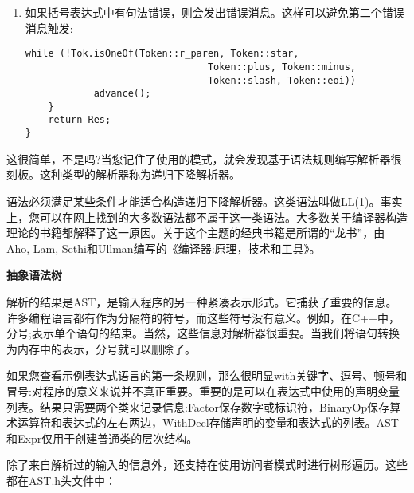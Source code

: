 \begin{enumerate}
\item 如果括号表达式中有句法错误，则会发出错误消息。这样可以避免第二个错误消息触发:
\begin{lstlisting}[caption={}]
			while (!Tok.isOneOf(Token::r_paren, Token::star,
								Token::plus, Token::minus,
								Token::slash, Token::eoi))
			advance();
	}
	return Res;
}
\end{lstlisting}

\end{enumerate}

这很简单，不是吗?当您记住了使用的模式，就会发现基于语法规则编写解析器很刻板。这种类型的解析器称为递归下降解析器。

\begin{tcolorbox}[colback=blue!5!white,colframe=blue!75!black, title=递归下降解析器不能适配所有语法]
语法必须满足某些条件才能适合构造递归下降解析器。这类语法叫做LL(1)。事实上，您可以在网上找到的大多数语法都不属于这一类语法。大多数关于编译器构造理论的书籍都解释了这一原因。关于这个主题的经典书籍是所谓的“龙书”，由Aho, Lam, Sethi和Ullman编写的《编译器:原理，技术和工具》。
\end{tcolorbox}


\hspace*{\fill} \par %
\textbf{抽象语法树}

解析的结果是AST，是输入程序的另一种紧凑表示形式。它捕获了重要的信息。许多编程语言都有作为分隔符的符号，而这些符号没有意义。例如，在C++中，分号;表示单个语句的结束。当然，这些信息对解析器很重要。当我们将语句转换为内存中的表示，分号就可以删除了。\par

如果您查看示例表达式语言的第一条规则，那么很明显with关键字、逗号、顿号和冒号:对程序的意义来说并不真正重要。重要的是可以在表达式中使用的声明变量列表。结果只需要两个类来记录信息:Factor保存数字或标识符，BinaryOp保存算术运算符和表达式的左右两边，WithDecl存储声明的变量和表达式的列表。AST和Expr仅用于创建普通类的层次结构。\par

除了来自解析过的输入的信息外，还支持在使用访问者模式时进行树形遍历。这些都在AST.h头文件中：\par


